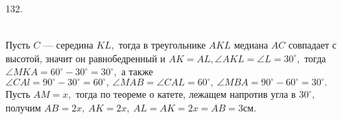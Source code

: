 132. \begin{figure}[ht!]
\end{figure}\\
Пусть $C$ --- середина $KL,$ тогда в треугольнике $AKL$ медиана $AC$ совпадает с высотой, значит он равнобедренный и  $AK=AL, \angle AKL=\angle L=30^\circ,$ тогда $\angle MKA=60^\circ-30^\circ=30^\circ,$ а также $\angle CAl=90^\circ-30^\circ=60^\circ,\ \angle MAB=\angle CAL=60^\circ,\ \angle MBA=90^\circ-60^\circ=30^\circ.$
Пусть $AM=x,$ тогда по теореме о катете, лежащем напротив угла в $30^\circ,$ получим $AB=2x,\ AK=2x,\ AL=AK=2x=AB=3$см.\\
